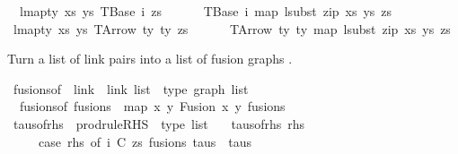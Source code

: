 \begin{isabellebody}
\ \ {\isachardoublequoteopen}lmap{\isacharunderscore}{\kern0pt}ty\ xs\ ys\ {\isacharparenleft}{\kern0pt}TBase\ i\ zs{\isacharparenright}{\kern0pt}\ {\isacharequal}{\kern0pt}\isanewline
\ \ \ \ \ TBase\ i\ {\isacharparenleft}{\kern0pt}map\ {\isacharparenleft}{\kern0pt}lsubst\ {\isacharparenleft}{\kern0pt}zip\ xs\ ys{\isacharparenright}{\kern0pt}{\isacharparenright}{\kern0pt}\ zs{\isacharparenright}{\kern0pt}{\isachardoublequoteclose}\isanewline
{\isacharbar}{\kern0pt}\ {\isachardoublequoteopen}lmap{\isacharunderscore}{\kern0pt}ty\ xs\ ys\ {\isacharparenleft}{\kern0pt}TArrow\ ty{}\ ty{}\ zs{\isacharparenright}{\kern0pt}\ {\isacharequal}{\kern0pt}\isanewline
\ \ \ \ \ TArrow\ ty{}\ ty{}\ {\isacharparenleft}{\kern0pt}map\ {\isacharparenleft}{\kern0pt}lsubst\ {\isacharparenleft}{\kern0pt}zip\ xs\ ys{\isacharparenright}{\kern0pt}{\isacharparenright}{\kern0pt}\ zs{\isacharparenright}{\kern0pt}{\isachardoublequoteclose}%
\begin{isamarkuptext}%
Turn a list of link pairs  into a list of fusion graphs .%
\end{isamarkuptext}\isamarkuptrue%
\isamarkupfalse%
\ fusions{\isacharunderscore}{\kern0pt}of\ {\isacharcolon}{\kern0pt}{\isacharcolon}{\kern0pt}\ {\isachardoublequoteopen}{\isacharparenleft}{\kern0pt}link\ {\isacharasterisk}{\kern0pt}\ link{\isacharparenright}{\kern0pt}\ list\ {\isacharequal}{\kern0pt}{\isachargreater}{\kern0pt}\ type\ graph\ list{\isachardoublequoteclose}\ \isanewline
\ \ {\isachardoublequoteopen}fusions{\isacharunderscore}{\kern0pt}of\ fusions\ {\isacharequal}{\kern0pt}\ map\ {\isacharparenleft}{\kern0pt}{\isasymlambda}{\isacharparenleft}{\kern0pt}x{\isacharcomma}{\kern0pt}\ y{\isacharparenright}{\kern0pt}{\isachardot}{\kern0pt}\ Fusion\ x\ y{\isacharparenright}{\kern0pt}\ fusions{\isachardoublequoteclose}\isanewline
\isanewline
{}\isamarkupfalse%
\ taus{\isacharunderscore}{\kern0pt}of{\isacharunderscore}{\kern0pt}rhs\ {\isacharcolon}{\kern0pt}{\isacharcolon}{\kern0pt}\ {\isachardoublequoteopen}prodrule{\isacharunderscore}{\kern0pt}RHS\ {\isacharequal}{\kern0pt}{\isachargreater}{\kern0pt}\ type\ list{\isachardoublequoteclose}\ \isanewline
\ \ {\isachardoublequoteopen}taus{\isacharunderscore}{\kern0pt}of{\isacharunderscore}{\kern0pt}rhs\ rhs\ {\isacharequal}{\kern0pt}\isanewline
\ \ \ \ \ {\isacharparenleft}{\kern0pt}case\ rhs\ of\ {\isacharparenleft}{\kern0pt}i{\isacharcomma}{\kern0pt}\ {\isacharparenleft}{\kern0pt}C{\isacharcomma}{\kern0pt}\ zs{\isacharparenright}{\kern0pt}{\isacharcomma}{\kern0pt}\ fusions{\isacharcomma}{\kern0pt}\ taus{\isacharparenright}{\kern0pt}\ {\isacharequal}{\kern0pt}{\isachargreater}{\kern0pt}\ taus{\isacharparenright}{\kern0pt}{\isachardoublequoteclose}%

\end{isabellebody}

